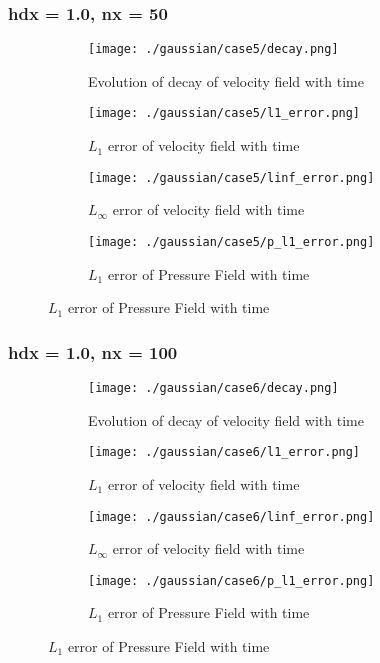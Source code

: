 \documentclass[11pt, a4paper]{article}
\begin{document}
\subsubsection{hdx = 1.0, nx = 50}
\begin{figure}[H]
\begin{subfigure}{0.48\textwidth}
\texttt{[image: ./gaussian/case5/decay.png]}
\caption{Evolution of decay of velocity field with time}
\end{subfigure}
\begin{subfigure}{0.48\textwidth}
\texttt{[image: ./gaussian/case5/l1\_error.png]}
\caption{$L_1$ error of velocity field with time}
\end{subfigure}
\medskip
\begin{subfigure}{0.48\textwidth}
\texttt{[image: ./gaussian/case5/linf\_error.png]}
\caption{$L_\infty$ error of velocity field with time}
\end{subfigure}
\begin{subfigure}{0.48\textwidth}
\texttt{[image: ./gaussian/case5/p\_l1\_error.png]}
\caption{$L_1$ error of Pressure Field with time}
\end{subfigure}
\end{figure}

\subsubsection{hdx = 1.0, nx = 100}
\begin{figure}[H]
\begin{subfigure}{0.48\textwidth}
\texttt{[image: ./gaussian/case6/decay.png]}
\caption{Evolution of decay of velocity field with time}
\end{subfigure}
\begin{subfigure}{0.48\textwidth}
\texttt{[image: ./gaussian/case6/l1\_error.png]}
\caption{$L_1$ error of velocity field with time}
\end{subfigure}
\medskip
\begin{subfigure}{0.48\textwidth}
\texttt{[image: ./gaussian/case6/linf\_error.png]}
\caption{$L_\infty$ error of velocity field with time}
\end{subfigure}
\begin{subfigure}{0.48\textwidth}
\texttt{[image: ./gaussian/case6/p\_l1\_error.png]}
\caption{$L_1$ error of Pressure Field with time}
\end{subfigure}
\end{figure}
\end{document}
